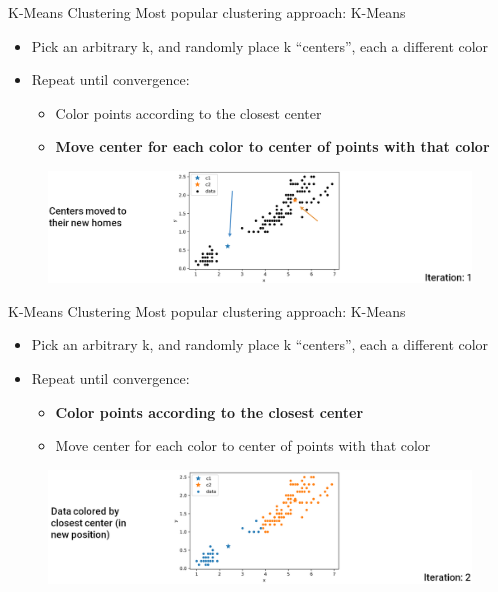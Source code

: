 \documentclass[aspectratio=169]{../latex_main/tntbeamer}  %
\begin{document}
	
	
	\begin{frame}{K-Means Clustering}
	    Most popular clustering approach: K-Means
	    \begin{itemize}
	        \item Pick an arbitrary k, and randomly place k “centers”, each a different color
	        \item Repeat until convergence:
	        \begin{itemize}
	            \item Color points according to the closest center
	            \item \textbf{Move center for each color to center of points with that color}
	        \end{itemize}
	    \end{itemize}
	    \begin{figure}
	        \centering
	        \includegraphics[scale=.39]{Bild11}
	    \end{figure}
	\end{frame}
	
	
	
	
	
	\begin{frame}{K-Means Clustering}
	    Most popular clustering approach: K-Means
	    \begin{itemize}
	        \item Pick an arbitrary k, and randomly place k “centers”, each a different color
	        \item Repeat until convergence:
	        \begin{itemize}
	            \item \textbf{Color points according to the closest center}
	            \item Move center for each color to center of points with that color
	        \end{itemize}
	    \end{itemize}
	    \begin{figure}
	        \centering
	        \includegraphics[scale=.38]{Bild12}
	    \end{figure}
	\end{frame}
	
\end{document}
